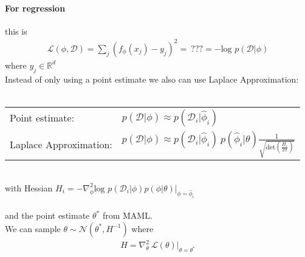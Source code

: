 \documentclass{article}
\begin{document}
\paragraph{For regression} this is
\begin{align*}
	\mathcal{L}(\phi, \mathcal{D}) = \sum_{j} (f_{\phi}(x_j) - y_j)^2 = \: ??? =  - \text{log } p(\mathcal{D} \vert \phi)
\end{align*}
where $y_j \in \mathbb{R}^d$
\\ 
Instead of only using a point estimate we also can use Laplace Approximation: \\
\\
\begin{tabular}{l l}
	Point estimate: & $p(\mathcal{D} \vert \phi) \approx p(\mathcal{D}_i \vert \hat{\phi}_i)$ \\
	Laplace Approximation: & $p(\mathcal{D} \vert \phi) \approx p(\mathcal{D}_i \vert \hat{\phi}_i) \: p(\hat{\phi}_i \vert \theta) \frac{1}{\sqrt{\text{det}(\frac{H_i}{2\pi})}}$ 
\end{tabular} \\
with Hessian $H_i = -\nabla_{\phi}^2 \text{log }p(\mathcal{D}_i \vert \phi)p(\phi \vert \theta) \vert_{\phi=\hat{\phi}_i}$
\\ \\
and the point estimate $\theta^*$ from MAML. \\
We can sample $\theta \sim \mathcal{N}(\theta^*, H^{-1})$ where
\begin{align}
	H = \nabla_{\theta}^2 \: \mathcal{L}(\theta) \vert_{\theta = \theta^*}
\end{align}
\end{document}
